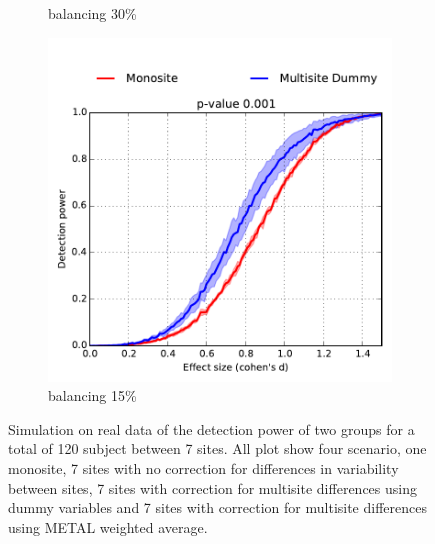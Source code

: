 \documentclass[authoryear]{elsarticle}
\begin{document}
\begin{figure}
\begin{subfigure}[b]{0.31\textwidth}
            {{\tiny balancing 30\%}}    
            \label{fig:mean and std of net24}
        \end{subfigure}
        \hfill
        \begin{subfigure}[b]{0.31\textwidth}   
            \centering 
            \includegraphics[width=\textwidth]{../figures/realdata_detect_pow_sitepatho_s120_15pct.pdf}
            {{\tiny balancing 15\%}}    
            \label{fig:mean and std of net34}
        \end{subfigure}
        \caption[]
        {\small Simulation on real data of the detection power of two groups for a total of 120 subject between 7 sites. All plot show four scenario, one monosite, 7 sites with no correction for differences in variability between sites, 7 sites with correction for multisite differences using dummy variables and 7 sites with correction for multisite differences using METAL weighted average.}
         
        \label{fig:real_sim_samplesize_5050}
\end{figure}
    
\end{document}
